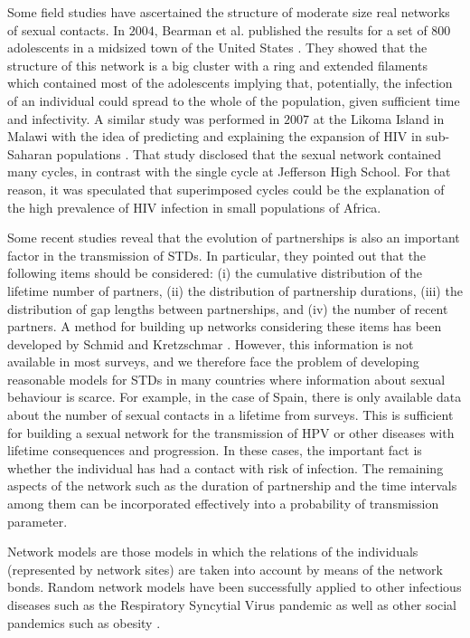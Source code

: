 Some field studies have ascertained the structure of moderate size real networks of sexual contacts. In $2004$, Bearman et al. published the results for a set of $800$ adolescents in a midsized town of the United States \cite{bearman2004chains}. They  showed that the structure of this network is a big cluster with a ring and extended filaments which contained most of the adolescents implying that, potentially, the infection of an individual could spread to the whole of the population, given sufficient time and infectivity. A similar study was performed in $2007$ at the Likoma Island in Malawi with the idea of predicting and explaining the expansion of HIV in sub-Saharan populations \cite{helleringer2007sexual}. That study disclosed  that the sexual network contained many cycles, in contrast with the single cycle at Jefferson High School. For that reason, it was speculated that superimposed cycles could be the explanation of the high prevalence of HIV infection in small populations of Africa.

Some recent studies reveal that the evolution of partnerships is also an important factor in the transmission of STDs. In particular, they pointed out that the following items should be considered: (i) the cumulative distribution of the lifetime number of partners, (ii) the distribution of partnership durations, (iii) the distribution of gap lengths between partnerships, and (iv) the number of recent partners. A method for building up networks considering these items has been developed by Schmid and Kretzschmar \cite{schmid2012determinants}. However, this information is not available in most surveys, and we therefore face the problem of developing reasonable models for STDs in many countries where information about sexual behaviour is scarce. For example, in the case of Spain, there is only available data about the number of sexual contacts in a lifetime from surveys. This is sufficient for building a sexual network for the transmission of HPV or other diseases with lifetime consequences and progression. In these cases, the important fact is whether the individual has had a contact with risk of infection. The remaining aspects of the network such as the duration of partnership and the time intervals among them can be incorporated effectively into a probability of transmission parameter.

Network models are those models in which the relations of the individuals (represented by network sites) are taken into account by means of the network bonds. Random network models have been successfully applied to other infectious diseases such as the Respiratory Syncytial Virus pandemic \cite{acedo2011using} as well as other social pandemics such as obesity \cite{christakis2007spread}.

